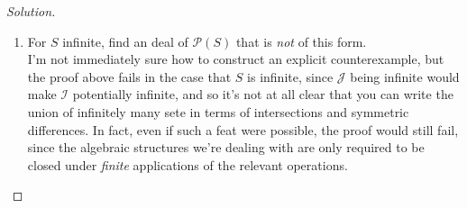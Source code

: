 \documentclass[12pt]{article}
\newenvironment{solution}
  {\renewcommand\qedsymbol{$\blacksquare$}\begin{proof}[Solution]}
{\end{proof}}
\theoremstyle{remark}
\begin{document}
\begin{solution}
\begin{enumerate}
      \item For $S$ infinite, find an deal of $\mathscr{P}(S)$ that is \textit{not} of this form.\\
      I'm not immediately sure how to construct an explicit counterexample, but the proof above fails
      in the case that $S$ is infinite, since $\mathcal{J}$ being infinite would make $\mathcal{I}$
      potentially infinite, and so it's not at all clear that you can write the union of infinitely
      many sete in terms of intersections and symmetric differences.
      In fact, even if such a feat were possible, the proof would still fail, since the
      algebraic structures we're dealing with are only required to be closed under \textit{finite} 
      applications of the relevant operations.
  \end{enumerate}



  
\end{solution}
\end{document}

